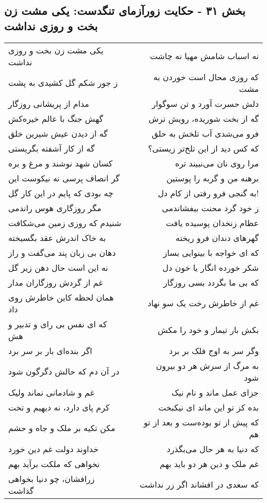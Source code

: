 \begin{center}
\section*{بخش ۳۱ - حکایت زورآزمای تنگدست: یکی مشت زن بخت و روزی نداشت}
\label{sec:031}
\begin{longtable}{l p{0.5cm} r}
یکی مشت زن بخت و روزی نداشت
&&
نه اسباب شامش مهیا نه چاشت
\\
ز جور شکم گل کشیدی به پشت
&&
که روزی محال است خوردن به مشت
\\
مدام از پریشانی روزگار
&&
دلش حسرت آورد و تن سوگوار
\\
گهش جنگ با عالم خیره‌کش
&&
گه از بخت شوریده، رویش ترش
\\
گه از دیدن عیش شیرین خلق
&&
فرو می‌شدی آب تلخش به حلق
\\
گه از کار آشفته بگریستی
&&
که کس دید از این تلخ‌تر زیستی؟
\\
کسان شهد نوشند و مرغ و بره
&&
مرا روی نان می‌نبیند تره
\\
گر انصاف پرسی نه نیکوست این
&&
برهنه من و گربه را پوستین
\\
چه بودی که پایم در این کار گل
&&
به گنجی فرو رفتی از کام دل!
\\
مگر روزگاری هوس راندمی
&&
ز خود گرد محنت بیفشاندمی
\\
شنیدم که روزی زمین می‌شکافت
&&
عظام زنخدان پوسیده یافت
\\
به خاک اندرش عقد بگسیخته
&&
گهرهای دندان فرو ریخته
\\
دهان بی زبان پند می‌گفت و راز
&&
که ای خواجه با بینوایی بساز
\\
نه این است حال دهن زیر گل
&&
شکر خورده انگار یا خون دل
\\
غم از گردش روزگاران مدار
&&
که بی ما بگردد بسی روزگار
\\
همان لحظه کاین خاطرش روی داد
&&
غم از خاطرش رخت یک سو نهاد
\\
که ای نفس بی رای و تدبیر و هش
&&
بکش بار تیمار و خود را مکش
\\
اگر بنده‌ای بار بر سر برد
&&
وگر سر به اوج فلک بر برد
\\
در آن دم که حالش دگرگون شود
&&
به مرگ از سرش هر دو بیرون شود
\\
غم و شادمانی نماند ولیک
&&
جزای عمل ماند و نام نیک
\\
کرم پای دارد، نه دیهیم و تخت
&&
بده کز تو این ماند ای نیکبخت
\\
مکن تکیه بر ملک و جاه و حشم
&&
که پیش از تو بوده‌ست و بعد از تو هم
\\
خداوند دولت غم دین خورد
&&
که دنیا به هر حال می‌بگذرد
\\
نخواهی که ملکت برآید بهم
&&
غم ملک و دین هر دو باید بهم
\\
زرافشان، چو دنیا بخواهی گذاشت
&&
که سعدی در افشاند اگر زر نداشت
\\
\end{longtable}
\end{center}

